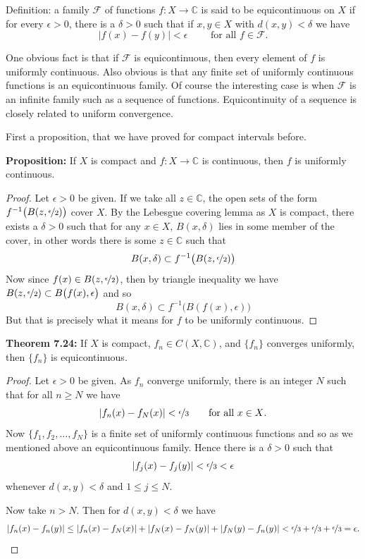 \documentclass[12pt]{book}
\newcommand{\abs}[1]{\left\lvert {#1} \right\rvert}
\newcommand{\C}{{\mathbb{C}}}
\newcommand{\sF}{{\mathcal{F}}}
\theoremstyle{plain}
\theoremstyle{remark}
\theoremstyle{definition}
\theoremstyle{exercise}
\theoremstyle{example}
\begin{document}
Definition: a family $\sF$ of functions $f \colon X \to \C$ is said to be
equicontinuous on $X$ if for every $\epsilon > 0$, there is a $\delta > 0$
such that if $x, y \in X$ with $d(x,y) < \delta$ we have
$$
\abs{f(x)-f(y)} < \epsilon \qquad \text{ for all $f \in \sF$} .
$$

One obvious fact is that if $\sF$ is equicontinuous, then every element of
$f$ is uniformly continuous.  Also obvious is that any finite set of
uniformly continuous functions is an equicontinuous family.  Of course the
interesting case is when $\sF$ is an infinite family such as a sequence of
functions.  Equicontinuity of a sequence
is closely related to uniform convergence.

\medskip

First a proposition, that we have proved for compact intervals before.

\medskip

\textbf{Proposition:}
If $X$ is compact and $f \colon X \to \C$ is continuous, then
$f$ is uniformly continuous.

\medskip

\begin{proof}
Let $\epsilon > 0$ be given.
If we take all $z \in \C$,
the open sets of the form $f^{-1}\bigl(B(z,\nicefrac{\epsilon}{2})\bigr)$
cover $X$.
By the Lebesgue covering lemma as $X$ is compact,
there exists a $\delta > 0$
such that for any $x \in X$, $B(x,\delta)$ lies in some member of the cover,
in other words there is some $z \in \C$ such that
$$
B(x,\delta) \subset f^{-1}\bigl(B(z,\nicefrac{\epsilon}{2})\bigr)
$$
Now since $f(x) \in B(z,\nicefrac{\epsilon}{2})$,
then by triangle inequality we have
$B(z,\nicefrac{\epsilon}{2}) \subset B\bigl(f(x),\epsilon\bigr)$ and so
$$
B(x,\delta) \subset f^{-1}\bigl(B(f(x),\epsilon)\bigr)
$$
But that is precisely what it means for $f$ to be uniformly continuous.
\end{proof}

\medskip

\textbf{Theorem 7.24:}
If $X$ is compact, $f_n \in C(X,\C)$, and $\{ f_n \}$
converges uniformly, then $\{ f_n \}$ is equicontinuous.

\medskip

\begin{proof}
Let $\epsilon > 0$ be given.
As $f_n$ converge uniformly, there is an integer $N$ such that for
all $n \geq N$ we have
$$
\abs{f_n(x)-f_N(x)} < \nicefrac{\epsilon}{3} \qquad \text{for all $x \in X$}.
$$
Now $\{ f_1,f_2,\ldots,f_N \}$ is a finite set of uniformly continuous
functions and so as we mentioned above an equicontinuous family.  Hence
there is a $\delta > 0$ such that
$$
\abs{f_j(x)-f_j(y)} < \nicefrac{\epsilon}{3} < \epsilon
$$
whenever $d(x,y) < \delta$ and $1 \leq j \leq N$.

Now take $n > N$.  Then for $d(x,y) < \delta$ we have
\begin{equation*}
\abs{f_n(x)-f_n(y)}
\leq
\abs{f_n(x)-f_N(x)}
+
\abs{f_N(x)-f_N(y)}
+
\abs{f_N(y)-f_n(y)}
<
\nicefrac{\epsilon}{3}
+
\nicefrac{\epsilon}{3}
+
\nicefrac{\epsilon}{3}
=\epsilon .
\end{equation*}
\end{proof}
\end{document}
